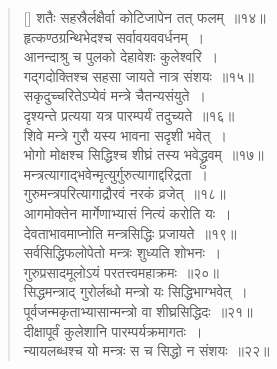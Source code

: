 \documentclass[twoside,12pt,notitlepage]{book}
\begin{document}
\begin{verse}[\versewidth]
शतैः सहस्रैर्लक्षैर्वा कोटिजापेन तत् फलम्~॥१४॥\footA \\ 
हृत्कण्ठग्रन्थिभेदश्च सर्वावयववर्धनम्~।\\[-6pt]
आनन्दाश्रु च पुलको देहावेशः कुलेश्वरि~।\\[-6pt]
गद्गदोक्तिश्च सहसा जायते नात्र संशयः~॥१५॥\footA \\ 
सकृदुच्चरितेऽप्येवं मन्त्रे चैतन्यसंयुते~।\\[-6pt]
दृश्यन्ते प्रत्यया यत्र पारम्पर्यं तदुच्यते~॥१६॥\\
शिवे मन्त्रे गुरौ यस्य भावना सदृशी भवेत्~।\\[-6pt]
भोगो मोक्षश्च सिद्धिश्च शीघ्रं तस्य भवेद्ध्रुवम्~॥१७॥\\
मन्त्रत्यागाद्भवेन्मृत्युर्गुरुत्यागाद्दरिद्रता~।\\[-6pt]
गुरुमन्त्रपरित्यागाद्रौरवं नरकं व्रजेत्~॥१८॥\\
आगमोक्तेन मार्गेणाभ्यासं नित्यं करोति यः~।\\[-6pt]
देवताभावमाप्नोति मन्त्रसिद्धिः प्रजायते~॥१९॥\\
सर्वसिद्धिफलोपेतो मन्त्रः शुध्यति शोभनः~।\\[-6pt]
गुरुप्रसादमूलोऽयं परतत्त्वमहाक्रमः~॥२०॥\\
सिद्धमन्त्राद् गुरोर्लब्धो मन्त्रो यः सिद्धिभाग्भवेत्~।\\[-6pt]
पूर्वजन्मकृताभ्यासान्मन्त्रो वा शीघ्रसिद्धिदः~॥२१॥\footA \\
दीक्षापूर्वं कुलेशानि पारम्पर्यक्रमागतः~।\\[-6pt]
न्यायलब्धश्च यो मन्त्रः स च सिद्धो न संशयः~॥२२॥
\end{verse}
\end{document}
